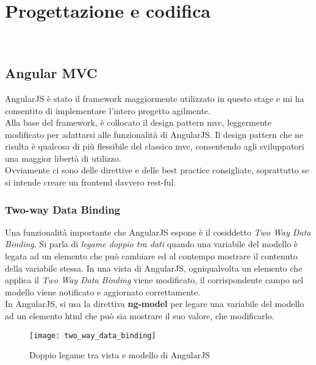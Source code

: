 
\chapter{Progettazione e codifica}
\label{cap:progettazione-codifica}

\\


\section{Angular MVC}
AngularJS è stato il framework maggiormente utilizzato in questo stage e mi ha consentito di implementare l'intero progetto agilmente.\\
Alla base del framework, è collocato il design pattern \gls{mvc}, leggermente modificato per adattarsi alle funzionalità di AngularJS. Il design pattern che ne risulta è qualcosa di più flessibile del classico \gls{mvc}, consentendo agli sviluppatori una maggior libertà di utilizzo.\\
Ovviamente ci sono delle direttive e delle best practice consigliate, soprattutto se si intende creare un \gls{frontend} davvero \gls{rest}-ful.

\subsection{Two-way Data Binding}
Una funzionalità importante che AngularJS espone è il cosiddetto \emph{Two Way Data Binding}. Si parla di \emph{legame doppio tra dati} quando una variabile del modello è legata ad un elemento che può cambiare ed al contempo mostrare il contenuto della variabile stessa. In una vista di AngularJS, ogniqualvolta un elemento che applica il \emph{Two Way Data Binding} viene modificato, il corrispondente campo nel modello viene notificato e aggiornato correttamente.\\
In AngularJS, si usa la direttiva \textbf{ng-model} per legare una variabile del modello ad un elemento \gls{html} che può sia mostrare il suo valore, che modificarlo.

\begin{figure}[H] 
    \centering 
    \texttt{[image: two\_way\_data\_binding]} 
    \caption{Doppio legame tra vista e modello di AngularJS}
\end{figure}




